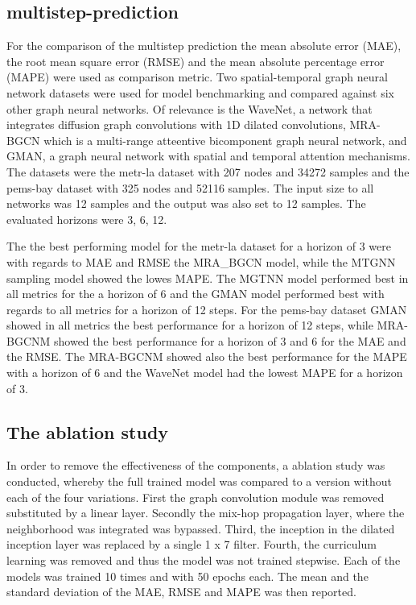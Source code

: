 \documentclass[letterpaper,twocolumn,11pt]{article}
\begin{document}
    \subsection{multistep-prediction}
    For the comparison of the multistep prediction the mean absolute error (MAE), the root mean square error (RMSE) and the mean absolute percentage error (MAPE) were used as comparison metric.
    Two spatial-temporal graph neural network datasets were used for model benchmarking and compared against six other graph neural networks.
    Of relevance is the WaveNet, a network that integrates diffusion graph convolutions with 1D dilated convolutions,
    MRA-BGCN which is a multi-range atteentive bicomponent graph neural network, and
    GMAN, a graph neural network with spatial and temporal attention mechanisms.
    The datasets were the metr-la dataset with 207 nodes and 34272 samples and the pems-bay dataset with 325 nodes and 52116 samples.
    The input size to all networks was 12 samples and the output was also set to 12 samples.
    The evaluated horizons were 3, 6, 12.

    The the best performing model for the metr-la dataset for a horizon of 3 were with regards to MAE and RMSE the MRA\_BGCN model, while the MTGNN sampling model showed the lowes MAPE.
    The MGTNN model performed best in all metrics for the a horizon of 6 and the GMAN model performed best with regards to all metrics for a horizon of 12 steps.
    For the pems-bay dataset GMAN showed in all metrics the best performance for a horizon of 12 steps, while MRA-BGCNM showed the best performance for a horizon of 3 and 6 for the MAE and the RMSE.
    The MRA-BGCNM showed also the best performance for the MAPE with a horizon of 6 and the WaveNet model had the lowest MAPE for a horizon of 3.

    \subsection{The ablation study}
    In order to remove the effectiveness of the components, a ablation study was conducted, whereby the full trained model was compared to a version without each of the four variations.
    First the graph convolution module was removed substituted by a linear layer.
    Secondly the mix-hop propagation layer, where the neighborhood was integrated was bypassed.
    Third, the inception in the dilated inception layer was replaced by a single 1 x 7 filter.
    Fourth, the curriculum learning was removed and thus the model was not trained stepwise.
    Each of the models was trained 10 times and with 50 epochs each.
    The mean and the standard deviation of the MAE, RMSE and MAPE was then reported.
\end{document}
